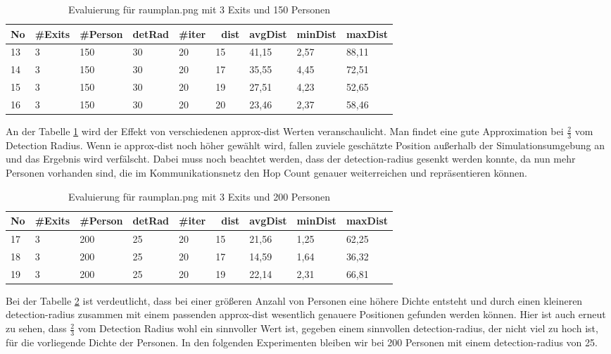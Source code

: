 \begin{table}[h]
\begin{tabular}{|l|l|l|l|l|l|l|l|l|}
\hline
No & \#Exits & \#Person & detRad & \#iter & ~dist & avgDist & minDist & maxDist \\ \hline
13 & 3       & 150      & 30     & 20     & 15    & 41,15   & 2,57    & 88,11   \\ \hline
14 & 3       & 150      & 30     & 20     & 17    & 35,55   & 4,45    & 72,51   \\ \hline
15 & 3       & 150      & 30     & 20     & 19    & 27,51   & 4,23    & 52,65   \\ \hline
16 & 3       & 150      & 30     & 20     & 20    & 23,46   & 2,37    & 58,46   \\ \hline
\end{tabular}
\caption{Evaluierung für raumplan.png mit 3 Exits und 150 Personen}
\label{fig:eva02}
\end{table}

An der Tabelle \ref{fig:eva02} wird der Effekt von verschiedenen approx-dist Werten veranschaulicht. Man findet eine gute Approximation bei \( \frac{2}{3} \) vom Detection Radius. Wenn ie approx-dist noch höher gewählt wird, fallen zuviele geschätzte Position außerhalb der Simulationsumgebung an und das Ergebnis wird verfälscht. Dabei muss noch beachtet werden, dass der detection-radius gesenkt werden konnte, da nun mehr Personen vorhanden sind, die im Kommunikationsnetz den Hop Count genauer weiterreichen und repräsentieren können.


\begin{table}[h]
\begin{tabular}{|l|l|l|l|l|l|l|l|l|}
\hline
No & \#Exits & \#Person & detRad & \#iter & ~dist & avgDist & minDist & maxDist \\ \hline
17 & 3       & 200      & 25     & 20     & 15    & 21,56   & 1,25    & 62,25   \\ \hline
18 & 3       & 200      & 25     & 20     & 17    & 14,59   & 1,64    & 36,32   \\ \hline
19 & 3       & 200      & 25     & 20     & 19    & 22,14   & 2,31    & 66,81   \\ \hline
\end{tabular}
\caption{Evaluierung für raumplan.png mit 3 Exits und 200 Personen}
\label{fig:eva03}
\end{table}

Bei der Tabelle \ref{fig:eva03} ist verdeutlicht, dass bei einer größeren Anzahl von Personen eine höhere Dichte entsteht und durch einen kleineren detection-radius zusammen mit einem passenden approx-dist wesentlich genauere Positionen gefunden werden können. Hier ist auch erneut zu sehen, dass \( \frac{2}{3} \) vom Detection Radius wohl ein sinnvoller Wert ist, gegeben einem sinnvollen detection-radius, der nicht viel zu hoch ist, für die vorliegende Dichte der Personen. In den folgenden Experimenten bleiben wir bei 200 Personen mit einem detection-radius von 25.

